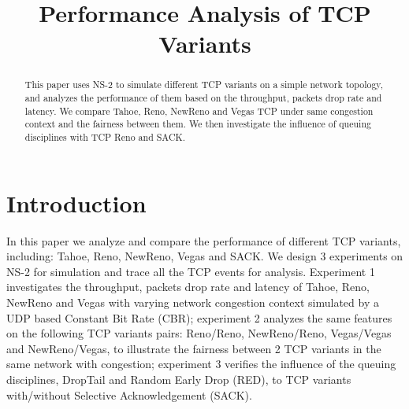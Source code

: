 \documentclass[10pt, conference]{lib/IEEEtran}
\begin{document}
\title{Performance Analysis of TCP Variants}

\author{
\and
{}
}
\maketitle


\begin{abstract}
This paper uses NS-2 to simulate different TCP variants on a simple network topology, and analyzes 
the performance of them based on the throughput, packets drop rate and latency. We compare Tahoe, 
Reno, NewReno and Vegas TCP under same congestion context and the fairness between them. We then 
investigate the influence of queuing disciplines with TCP Reno and SACK.
\end{abstract}


\section{Introduction}
In this paper we analyze and compare the performance of different TCP variants, including: Tahoe, 
Reno, NewReno, Vegas and SACK. We design 3 experiments on NS-2 for simulation and trace all the TCP 
events for analysis. Experiment 1 investigates the throughput, packets drop rate and latency of 
Tahoe, Reno, NewReno and Vegas with varying network congestion context simulated by a UDP based 
Constant Bit Rate (CBR); experiment 2 analyzes the same features on the following TCP variants pairs: 
Reno/Reno, NewReno/Reno, Vegas/Vegas and NewReno/Vegas, to illustrate the fairness between 2 TCP 
variants in the same network with congestion; experiment 3 verifies the influence of the queuing 
disciplines, DropTail and Random Early Drop (RED), to TCP variants with/without Selective Acknowledgement 
(SACK).
\end{document}
